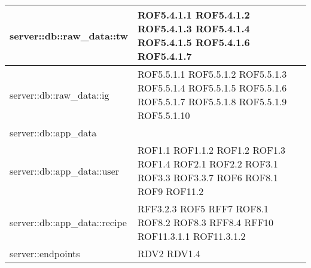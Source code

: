 \begin{center}
\begin{longtable}{| p{9cm} | p{4cm} |}
\hline
server::db::raw\_data::tw  & ROF5.4.1.1 \newline ROF5.4.1.2 \newline ROF5.4.1.3 \newline ROF5.4.1.4 \newline ROF5.4.1.5 \newline ROF5.4.1.6  \newline ROF5.4.1.7 \\
\hline
server::db::raw\_data::ig  & ROF5.5.1.1 \newline ROF5.5.1.2 \newline ROF5.5.1.3 \newline ROF5.5.1.4 \newline ROF5.5.1.5 \newline ROF5.5.1.6  \newline ROF5.5.1.7 \newline ROF5.5.1.8 \newline ROF5.5.1.9 \newline ROF5.5.1.10 \\
\hline
server::db::app\_data  &   \\
\hline
server::db::app\_data::user  &  ROF1.1 \newline ROF1.1.2 \newline ROF1.2 \newline ROF1.3 \newline ROF1.4 \newline ROF2.1 \newline ROF2.2 \newline ROF3.1 \newline ROF3.3 \newline ROF3.3.7 \newline ROF6 \newline ROF8.1 \newline ROF9 \newline ROF11.2 \\
\hline
server::db::app\_data::recipe &  RFF3.2.3 \newline ROF5 \newline RFF7 \newline ROF8.1 \newline ROF8.2 \newline ROF8.3 \newline RFF8.4 \newline RFF10 \newline ROF11.3.1.1 \newline ROF11.3.1.2 \\
\hline
server::endpoints  &  RDV2 \newline RDV1.4 \\

\end{longtable}
\end{center}
